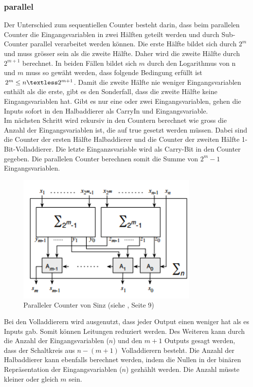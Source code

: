\documentclass[a4,abstract=on]{scrartcl}
\begin{document}
		\subsubsection{parallel}
Der Unterschied zum sequentiellen Counter besteht darin, dass beim parallelen Counter die Eingangsvariablen in zwei Hälften geteilt werden und durch Sub-Counter parallel verarbeitet werden können. Die erste Hälfte bildet sich durch $2^m$ und muss grösser sein als die zweite Hälfte. Daher wird die zweite Hälfte durch $2^{m+1}$ berechnet. In beiden Fällen bildet sich $m$ durch den Logarithmus von n und $m$ muss so gewäht werden, dass folgende Bedingung erfüllt ist $2^m \leq n \textless 2^{m+1}$. Damit die zweite Hälfte nie weniger Eingangsvariablen enthält als die erste, gibt es den Sonderfall, dass die zweite Hälfte keine Eingangsvariablen hat. Gibt es nur eine oder zwei Eingangsvariablen, gehen die Inputs sofort in den Halbaddierer als CarryIn und Eingangsvariable.\\
Im nächsten Schritt wird rekursiv in den Countern berechnet wie gross die Anzahl der Eingangsvariablen ist, die auf true gesetzt werden müssen. Dabei sind die Counter der ersten Hälfte Halbaddierer und die Counter der zweiten Hälfte 1-Bit-Volladdierer. Die letzte Einganzsvariable wird als Carry-Bit in den Counter gegeben. Die parallelen Counter berechnen somit die Summe von $2^m-1$ Eingangsvariablen.\\

\begin{figure}[H]
\centering
\includegraphics[width=9cm]{Sinz_para.png}
\caption{Paralleler Counter von Sinz (siehe \cite[][] {sinz}, Seite 9)}
\label{fig:sinz_counter_para}
\end{figure}

Bei den Volladdierern wird ausgenutzt, dass jeder Output einen weniger hat als es Inputs gab. Somit können Leitungen reduziert werden. Des Weiteren kann durch die Anzahl der Eingangsvariablen ($n$) und den $m+1$ Outputs gesagt werden, dass der Schaltkreis aus $n-(m+1)$ Volladdierern besteht. Die Anzahl der Halbaddierer kann ebenfalls berechnet werden, indem die Nullen in der binären Repräsentation der Eingangsvariablen ($n$) gezhählt werden. Die Anzahl müsste kleiner oder gleich $m$ sein.\\
\end{document}
